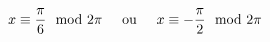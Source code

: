 \begin{displaymath}
  x \equiv \frac{\pi}{6} \mod 2\pi \hspace{0.5cm}\text{ou}\hspace{0.5cm} x \equiv -\frac{\pi}{2} \mod 2\pi
\end{displaymath}
